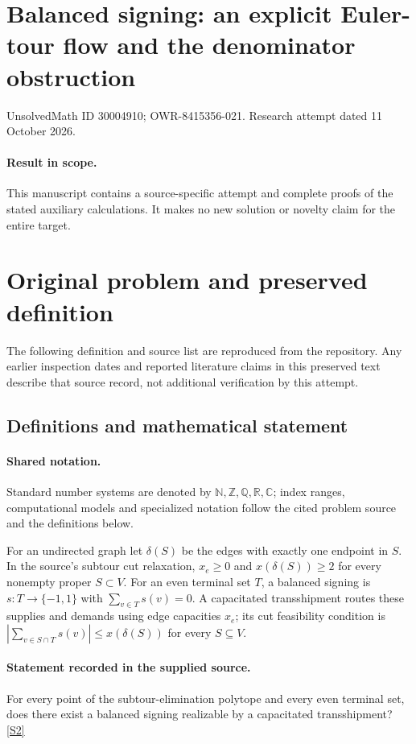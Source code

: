 \documentclass[11pt]{article}
\begin{document}
\section*{Balanced signing: an explicit Euler-tour flow and the denominator obstruction}
\noindent UnsolvedMath ID 30004910; OWR-8415356-021. Research attempt dated 11 October 2026.
\paragraph{Result in scope.}This manuscript contains a source-specific attempt and complete proofs of the stated auxiliary calculations. It makes no new solution or novelty claim for the entire target.
\section{Original problem and preserved definition}
The following definition and source list are reproduced from the repository. Any earlier inspection dates and reported literature claims in this preserved text describe that source record, not additional verification by this attempt.
\subsection{Definitions and mathematical statement}

\paragraph{Shared notation.}Standard number systems are denoted by $\mathbb N,\mathbb Z,\mathbb Q,\mathbb R,\mathbb C$; index ranges, computational models and specialized notation follow the cited problem source and the definitions below.


For an undirected graph let $\delta(S)$ be the edges with exactly one endpoint in $S$. In the source's subtour cut relaxation, $x_e\geq0$ and $x(\delta(S))\geq2$ for every nonempty proper $S\subset V$. For an even terminal set $T$, a balanced signing is $s:T\to\{-1,1\}$ with $\sum_{v\in T}s(v)=0$. A capacitated transshipment routes these supplies and demands using edge capacities $x_e$; its cut feasibility condition is $|\sum_{v\in S\cap T}s(v)|\leq x(\delta(S))$ for every $S\subseteq V$.
\paragraph{Statement recorded in the supplied source.}
For every point of the subtour-elimination polytope and every even terminal set, does there exist a balanced signing realizable by a capacitated transshipment? \href{https://doi.org/10.4171/owr/2021/53}{[S2]}
\end{document}
